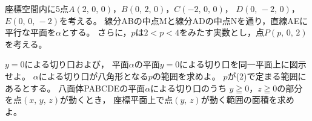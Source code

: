 \documentclass[../../main.tex]{subfiles}
\begin{document}
座標空間内に5点$A(2, \, 0, \, 0)$，$B(0, \, 2, \, 0)$，$C(-2, \, 0, \, 0)$，
$D(0, \, -2, \, 0)$，$E(0, \, 0, \, -2)$を考える。
線分ABの中点Mと線分ADの中点Nを通り，直線AEに平行な平面を$\alpha$とする。
さらに，$p$は$2<p<4$をみたす実数とし，点$P(p, \, 0, \, 2)$を考える。
\begin{enumerate}
  $y=0$による切り口および，
    平面$\alpha$の平面$y=0$による切り口を同一平面上に図示せよ。
  $\alpha$による切り口が八角形となる$p$の範囲を求めよ。
  $p$が(2)で定まる範囲にあるとする。
    八面体PABCDEの平面$\alpha$による切り口のうち
    $y\geqq0$，$z\geqq0$の部分を点$(x, \, y, \, z)$が動くとき，
    座標平面上で点$(y, \, z)$が動く範囲の面積を求めよ。
\end{enumerate}
\end{document}
